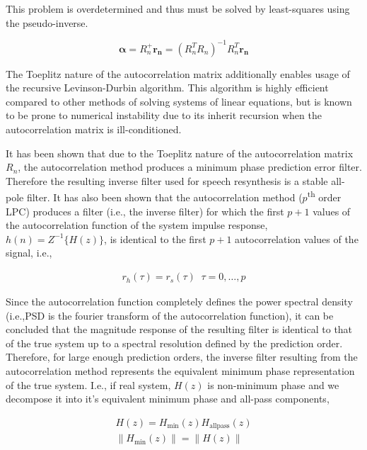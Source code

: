 \noindent
This problem is overdetermined and thus must be solved by least-squares using the pseudo-inverse. 

\begin{equation}
	 \boldsymbol{\alpha} = R_n^+ \boldsymbol{r_n}  = (R_n^T R_n)^{-1} R_n^T  \boldsymbol{r_n} 
\end{equation}

The Toeplitz nature of the autocorrelation matrix additionally enables usage of the recursive Levinson-Durbin algorithm. This algorithm is highly efficient compared to other methods of solving systems of linear equations, but is known to be prone to numerical instability due to its inherit recursion when the autocorrelation matrix is ill-conditioned.

It has been shown that due to the Toeplitz nature of the autocorrelation matrix $R_n$, the autocorrelation method produces a minimum phase prediction error filter. Therefore the resulting inverse filter used for speech resynthesis is a stable all-pole filter. It has also been shown that the autocorrelation method ($p$\textsuperscript{th} order LPC) produces a filter (i.e., the inverse filter) for which the first $p+1$ values of the autocorrelation function of the system impulse response, $h(n)=Z^{-1}\{H(z)\}$, is identical to the first $p+1$ autocorrelation values of the signal, i.e.,

\begin{eqnarray}
	r_h(\tau) = r_s(\tau) \;\; \tau=0, \dots, p
\end{eqnarray}

\noindent
Since the autocorrelation function completely defines the power spectral density (i.e.,PSD is the fourier transform of the autocorrelation function), it can be concluded that the magnitude response of the resulting filter is identical to that of the true system up to a spectral resolution defined by the prediction order. Therefore, for large enough prediction orders, the inverse filter resulting from the autocorrelation method represents the equivalent minimum phase representation of the true system. I.e., if real system, $H(z)$ is non-minimum phase and we decompose it into it's equivalent minimum phase and all-pass components,

\begin{eqnarray}
	H(z) = H_{\mathrm{min}}(z) H_{\mathrm{allpass}}(z) \\
	\| H_{\mathrm{min}}(z) \| = \| H(z) \|  \\
\end{eqnarray}

